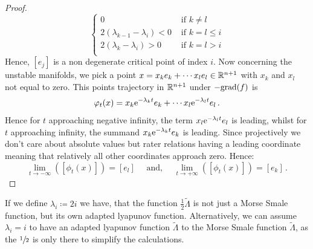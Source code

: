 \begin{example}
\begin{proof}
\begin{equation*}
				\begin{cases}
				0								&\text{ if }k\neq l \\
				2(\lambda_{k-1}-\lambda_i)<0	&\text{ if }k=l\leq i \\
				2(\lambda_k-\lambda_i)>0		&\text{ if } k=l > i\\
				\end{cases}
			\end{equation*} 
	 Hence, $[e_j]$ is a non degenerate critical point of index $i$. Now concerning the unstable manifolds, we pick a point $x=x_ke_k+\cdots x_le_l\in\mathbb{R}^{n+1}$ with $x_k$ and $x_l$ not equal to zero. This points trajectory in $\mathbb{R}^{n+1}$ under $-\mathrm{grad} (f)$ is
		\begin{equation*}
			\varphi_t(x)=x_k\mathrm{e}^{-\lambda_kt}e_k+\cdots x_l\mathrm{e}^{-\lambda_l t}e_l\,.
		\end{equation*} Hence for $t$ approaching negative infinity, the term $x_l\mathrm{e}^{-\lambda_l t}e_l$ is leading, whilst for $t$ approaching infinity, the summand $x_k\mathrm{e}^{-\lambda_kt}e_k$ is leading. Since projectively we don't care about absolute values but rater relations having a leading coordinate meaning that relatively all other coordinates approach zero. Hence:
		\begin{equation*}
			\lim_{t \to -\infty}([\phi_t(x)])=[e_l]\quad \text{ and, }\quad \lim_{t \to +\infty}([\phi_t(x)])=[e_k]\,.
		\end{equation*} 
			\end{proof}
\begin{corollary}
	If we define $\lambda_i\coloneq 2i$ we have, that the function $\frac{1}{2}\tilde{\Lambda}$ is not just a Morse Smale function, but its own adapted lyapunov function. Alternatively, we can assume $\lambda_i=i$ to have an adapted lyapunov function $\tilde{\Lambda}$ to the Morse Smale function $\tilde{\Lambda}$, as the $\sfrac{1}{2}$ is only there to simplify the calculations.
\end{corollary}

		


\end{example}
